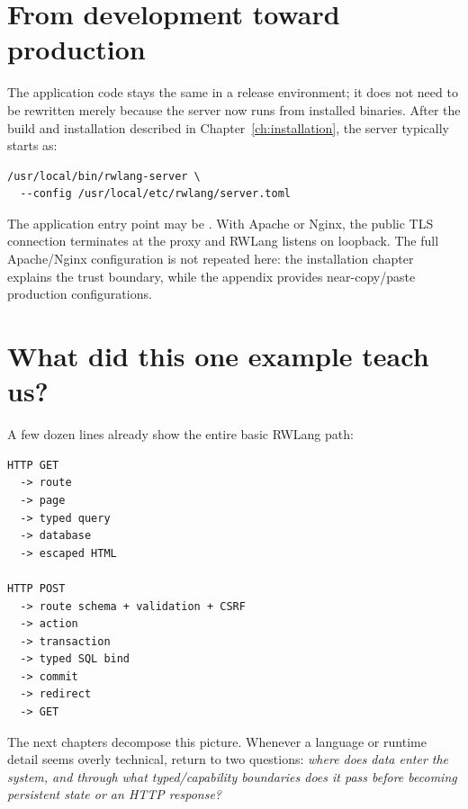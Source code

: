 \section{From development toward production}

The application code stays the same in a release environment; it does not need to be rewritten merely because the server now runs from installed binaries. After the build and installation described in Chapter~\ref{ch:installation}, the server typically starts as:

\begin{lstlisting}
/usr/local/bin/rwlang-server \
  --config /usr/local/etc/rwlang/server.toml
\end{lstlisting}

The application entry point may be . With Apache or Nginx, the public TLS connection terminates at the proxy and RWLang listens on loopback. The full Apache/Nginx configuration is not repeated here: the installation chapter explains the trust boundary, while the appendix provides near-copy/paste production configurations.

\section{What did this one example teach us?}

A few dozen lines already show the entire basic RWLang path:

\begin{lstlisting}
HTTP GET
  -> route
  -> page
  -> typed query
  -> database
  -> escaped HTML

HTTP POST
  -> route schema + validation + CSRF
  -> action
  -> transaction
  -> typed SQL bind
  -> commit
  -> redirect
  -> GET
\end{lstlisting}

The next chapters decompose this picture. Whenever a language or runtime detail seems overly technical, return to two questions: \emph{where does data enter the system, and through what typed/capability boundaries does it pass before becoming persistent state or an HTTP response?}
